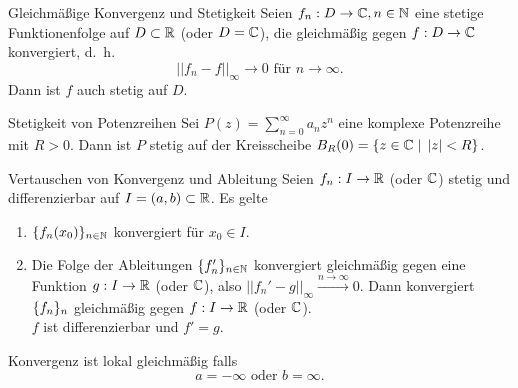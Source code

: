 \documentclass[main.tex]{subfiles}
\begin{document}
\begin{karte}{Gleichmäßige Konvergenz und Stetigkeit}
    Seien \( f_n : D \rightarrow \mathbb{C}, n\in\mathbb{N} \) eine 
    stetige Funktionenfolge auf \( D \subset \mathbb{R} \) 
    (oder \( D = \mathbb{C} \)), die gleichmäßig gegen 
    \( f: D \rightarrow \mathbb{C} \) konvergiert, d.\ h.\ 
    \[ ||f_n - f||_\infty \rightarrow 0 
    \text{ für } n\rightarrow\infty. \]
    Dann ist \(f\) auch stetig auf \(D\).
\end{karte}
\begin{karte}{Stetigkeit von Potenzreihen}
    Sei \( P(z) = \sum_{n=0}^\infty a_n z^n \) eine komplexe 
    Potenzreihe mit \( R > 0 \). Dann ist \( P \) stetig auf 
    der Kreisscheibe 
    \( B_R(0) = \{ z\in\mathbb{C} \; \vert \; \left| z \right| < R \} \).
\end{karte}
\begin{karte}{Vertauschen von Konvergenz und Ableitung}
    Seien \( f_n : I \rightarrow \mathbb{R} \) (oder \( \mathbb{C} \)) stetig 
    und differenzierbar auf \( I = (a,b) \subset \mathbb{R} \).
    Es gelte 
    \begin{enumerate}
        \item \( \{f_n(x_0)\}_{n\in\mathbb{N}} \) konvergiert für 
        \( x_0 \in I \).
        \item Die Folge der Ableitungen 
        \( \{ f_n' \}_{n \in \mathbb{N}} \) 
        konvergiert gleichmäßig gegen eine Funktion 
        \( g: I \rightarrow \mathbb{R} \) (oder \( \mathbb{C} \)), also 
        \( ||f_n' - g||_\infty 
        \overset{n\rightarrow\infty}{\longrightarrow} 0 \).
        Dann konvergiert \( \{f_n\}_n \) gleichmäßig gegen 
        \( f: I \rightarrow \mathbb{R} \) (oder \( \mathbb{C} \)). \\
        \( f \) ist differenzierbar und \( f' = g \).
    \end{enumerate}
    Konvergenz ist lokal gleichmäßig falls 
    \[ a = -\infty \text{ oder } b = \infty. \]
\end{karte}
\end{document}
